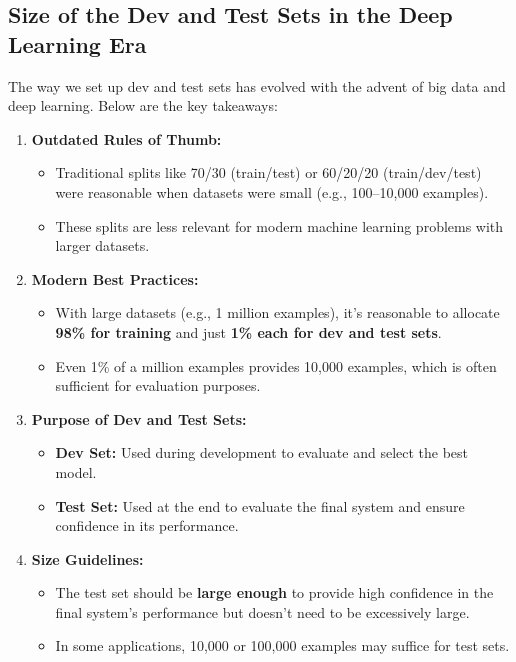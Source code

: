 \documentclass[letterpaper,12pt,notitlepage,twoside]{report}
\begin{document}
\subsection{Size of the Dev and Test Sets in the Deep Learning Era}
The way we set up dev and test sets has evolved with the advent of big data and deep learning. Below are the key takeaways:
\begin{enumerate}[label=\textbf{\arabic*.}]
    \item \textbf{Outdated Rules of Thumb:}
    \begin{itemize}
        \item Traditional splits like 70/30 (train/test) or 60/20/20 (train/dev/test) were reasonable when datasets were small (e.g., 100–10,000 examples).
        \item These splits are less relevant for modern machine learning problems with larger datasets.
    \end{itemize}

    \item \textbf{Modern Best Practices:}
    \begin{itemize}
        \item With large datasets (e.g., 1 million examples), it’s reasonable to allocate \textbf{98\% for training} and just \textbf{1\% each for dev and test sets}.
        \item Even 1\% of a million examples provides 10,000 examples, which is often sufficient for evaluation purposes.
    \end{itemize}

    \item \textbf{Purpose of Dev and Test Sets:}
    \begin{itemize}
        \item \textbf{Dev Set:} Used during development to evaluate and select the best model.
        \item \textbf{Test Set:} Used at the end to evaluate the final system and ensure confidence in its performance.
    \end{itemize}

    \item \textbf{Size Guidelines:}
    \begin{itemize}
        \item The test set should be \textbf{large enough} to provide high confidence in the final system's performance but doesn't need to be excessively large.
        \item In some applications, 10,000 or 100,000 examples may suffice for test sets.
    \end{itemize}


\end{enumerate}
\end{document}
